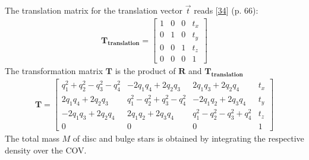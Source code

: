 \documentclass[letterpaper,10pt,english]{sphinxmanual}
\begin{document}
			\sphinxAtStartPar
			The translation matrix for the translation vector \(\vec{t}\) reads {[}\hyperlink{cite.NBodySimulation/Appendix:id8}{34}{]} (p. 66):
			\begin{equation*}
			\begin{split}\mathbf{T_{translation}}=\begin{bmatrix}
			1 & 0 & 0 & t_{x}\\
			0 & 1 & 0 & t_{y}\\
			0 & 0 & 1 & t_{z}\\
			0  & 0 & 0 & 1
			\end{bmatrix}\end{split}
			\end{equation*}
			\sphinxAtStartPar
			The transformation matrix \(\mathbf{T}\) is the product of \(\mathbf{R}\) and \(\mathbf{T_{translation}}\)
			\begin{equation}\label{equation:NBodySimulation/Initialization:transformation_matrix}
			\begin{split}\mathbf{T}=\begin{bmatrix}
			 q_{1}^{2}+q_{2}^{2}-q_{3}^{2}-q_{4}^{2} & -2q_{1}q_{4}+2q_{2}q_{3} & 2q_{1}q_{3}+2q_{2}q_{4} & t_{x}\\
			 2q_{1}q_{4}+2q_{2}q_{3} & q_{1}^{2}-q_{2}^{2}+q_{3}^{2}-q_{4}^{2} & -2q_{1}q_{2}+2q_{3}q_{4} & t_{y}\\
			 -2q_{1}q_{3}+2q_{2}q_{4} & 2q_{1}q_{2}+2q_{3}q_{4} & q_{1}^{2}-q_{2}^{2}-q_{3}^{2}+q_{4}^{2} & t_{z}\\
			 0  & 0 & 0 & 1
			 \end{bmatrix}\end{split}
			\end{equation}
			\sphinxAtStartPar
			The total mass \(M\) of disc and bulge stars is obtained by integrating the respective density over the COV.
			
\end{document}
